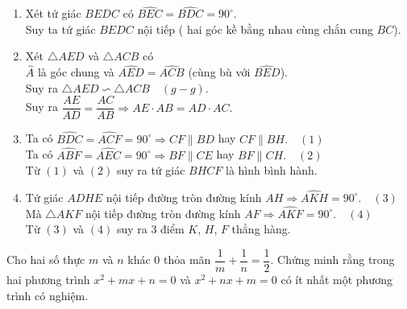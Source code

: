 \begin{ex}
{\begin{center}
 \end{center}
 	\begin{enumerate}
 		\item Xét tứ giác $ BEDC $ có $ \widehat{BEC} = \widehat{BDC} = 90^\circ $.\\
 		Suy ta tứ giác $ BEDC $ nội tiếp ( hai góc kề bằng nhau cùng chắn cung $ BC $).
 		\item Xét $ \triangle AED $ và $ \triangle ACB $ có\\
 		$ \widehat{A} $ là góc chung và $ \widehat{AED} = \widehat{ACB} $ (cùng bù với $ \widehat{BED} $).\\
 		Suy ra $ \triangle AED \backsim \triangle ACB \quad (g -g) $.\\
 		Suy ra $ \dfrac{AE}{AD} = \dfrac{AC}{AB}  \Rightarrow AE\cdot AB = AD \cdot AC.$\\
 		\item Ta có $ \widehat{BDC} = \widehat{ACF} =90^\circ \Rightarrow CF \parallel BD $ hay $ CF \parallel BH. \quad (1) $\\
 		Ta có $ \widehat{ABF} = \widehat{AEC} = 90^\circ \Rightarrow BF \parallel CE $ hay $ BF \parallel CH. \quad (2) $\\
 		Từ $ (1) $ và $ (2) $ suy ra tứ giác $ BHCF $ là hình bình hành.
 		\item Tứ giác $ ADHE $ nội tiếp đường tròn đường kính $ AH \Rightarrow \widehat{AKH} = 90^\circ. \quad (3) $\\
 		Mà $ \triangle AKF $ nội tiếp đường tròn đường kính $ AF \Rightarrow \widehat{AKF} =90^\circ. \quad (4) $\\
 		Từ $ (3) $ và $ (4) $ suy ra 3 điểm  $ K$, $ H $, $ F $ thẳng hàng.
 	\end{enumerate}}
 \begin{ex}%
 	Cho hai số thực $ m $ và $ n $ khác $ 0 $ thỏa mãn $ \dfrac{1}{m} + \dfrac{1}{n} = \dfrac{1}{2} $. Chứng minh rằng trong hai phương trình $ x^2 +mx +n = 0 $ và $ x^2 + nx +m = 0 $ có ít nhất một phương trình có nghiệm.
 	\end{ex}
 

\end{ex}
